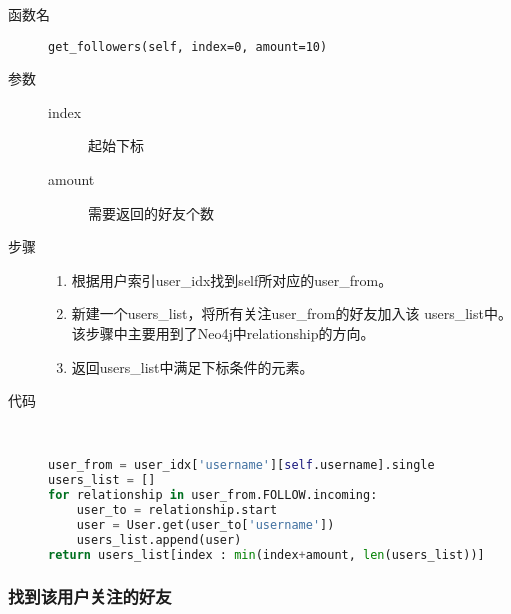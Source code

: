 \documentclass{yaldc}
\begin{document}
\begin{description}
    \item[函数名] \verb|get_followers(self, index=0, amount=10)|
    \item[参数]
        \begin{description}
            \item[index] 起始下标
            \item[amount] 需要返回的好友个数
        \end{description}
    \item[步骤]
        \begin{enumerate}
            \item 根据用户索引user\_idx找到self所对应的user\_from。
            \item 新建一个users\_list，将所有关注user\_from的好友加入该
                users\_list中。该步骤中主要用到了Neo4j中relationship的方向。
            \item 返回users\_list中满足下标条件的元素。
        \end{enumerate}
    \item[代码] ~
        \begin{lstlisting}[language=Python]
user_from = user_idx['username'][self.username].single
users_list = []
for relationship in user_from.FOLLOW.incoming:
    user_to = relationship.start
    user = User.get(user_to['username'])
    users_list.append(user)
return users_list[index : min(index+amount, len(users_list))]
        \end{lstlisting}
\end{description}

\subsubsection{找到该用户关注的好友}
\end{document}
